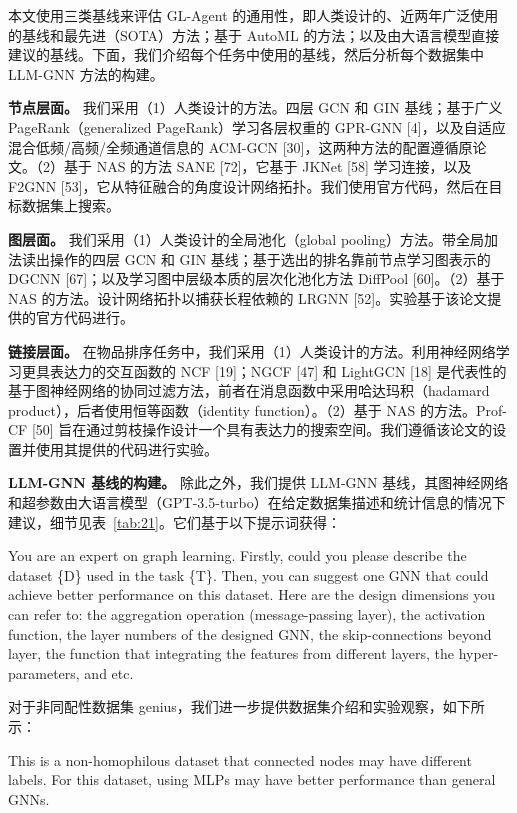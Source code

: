\documentclass[11pt,UTF8,fontset=fandol]{ctexart}
\begin{document}
本文使用三类基线来评估 GL-Agent 的通用性，即人类设计的、近两年广泛使用的基线和最先进（SOTA）方法；基于 AutoML 的方法；以及由大语言模型直接建议的基线。下面，我们介绍每个任务中使用的基线，然后分析每个数据集中 LLM-GNN 方法的构建。

\textbf{节点层面。} 我们采用（1）人类设计的方法。四层 GCN 和 GIN 基线；基于广义 PageRank（generalized PageRank）学习各层权重的 GPR-GNN [4]，以及自适应混合低频/高频/全频通道信息的 ACM-GCN [30]，这两种方法的配置遵循原论文。（2）基于 NAS 的方法 SANE [72]，它基于 JKNet [58] 学习连接，以及 F2GNN [53]，它从特征融合的角度设计网络拓扑。我们使用官方代码，然后在目标数据集上搜索。

\textbf{图层面。} 我们采用（1）人类设计的全局池化（global pooling）方法。带全局加法读出操作的四层 GCN 和 GIN 基线；基于选出的排名靠前节点学习图表示的 DGCNN [67]；以及学习图中层级本质的层次化池化方法 DiffPool [60]。（2）基于 NAS 的方法。设计网络拓扑以捕获长程依赖的 LRGNN [52]。实验基于该论文提供的官方代码进行。

\textbf{链接层面。} 在物品排序任务中，我们采用（1）人类设计的方法。利用神经网络学习更具表达力的交互函数的 NCF [19]；NGCF [47] 和 LightGCN [18] 是代表性的基于图神经网络的协同过滤方法，前者在消息函数中采用哈达玛积（hadamard product），后者使用恒等函数（identity function）。（2）基于 NAS 的方法。Prof-CF [50] 旨在通过剪枝操作设计一个具有表达力的搜索空间。我们遵循该论文的设置并使用其提供的代码进行实验。

\textbf{LLM-GNN 基线的构建。} 除此之外，我们提供 LLM-GNN 基线，其图神经网络和超参数由大语言模型（GPT-3.5-turbo）在给定数据集描述和统计信息的情况下建议，细节见表~\ref{tab:21}。它们基于以下提示词获得：

\begin{promptbox}
You are an expert on graph learning. Firstly, could you please describe the dataset \{D\} used in the task \{T\}. Then, you can suggest one GNN that could achieve better performance on this dataset. Here are the design dimensions you can refer to: the aggregation operation (message-passing layer), the activation function, the layer numbers of the designed GNN, the skip-connections beyond layer, the function that integrating the features from different layers, the hyper-parameters, and etc.
\end{promptbox}

对于非同配性数据集 genius，我们进一步提供数据集介绍和实验观察，如下所示：

\begin{promptbox}
This is a non-homophilous dataset that connected nodes may have different labels. For this dataset, using MLPs may have better performance than general GNNs.
\end{promptbox}
\end{document}

